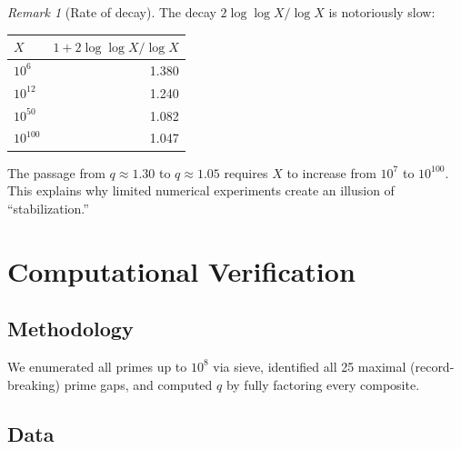 \documentclass[11pt, a4paper]{article}
\theoremstyle{definition}
\theoremstyle{remark}
\newtheorem{remark}[theorem]{Remark}
\begin{document}
\begin{remark}[Rate of decay]\label{rem:rate}
The decay $2\log\log X / \log X$ is notoriously slow:
\begin{center}
\renewcommand{\arraystretch}{1.1}
\begin{tabular}{@{}l r@{}}
\toprule
$X$ & $1 + 2\log\log X / \log X$ \\
\midrule
$10^{6}$    & 1.380 \\
$10^{12}$   & 1.240 \\
$10^{50}$   & 1.082 \\
$10^{100}$  & 1.047 \\
\bottomrule
\end{tabular}
\end{center}
The passage from $q \approx 1.30$ to $q \approx 1.05$
requires $X$ to increase from $10^7$ to $10^{100}$.
This explains why limited numerical experiments create
an illusion of ``stabilization.''
\end{remark}

\section{Computational Verification}\label{sec:data}

\subsection{Methodology}

We enumerated all primes up to $10^8$ via sieve,
identified all 25 maximal (record-breaking) prime gaps,
and computed $q$ by fully factoring every composite.

\subsection{Data}
\end{document}
